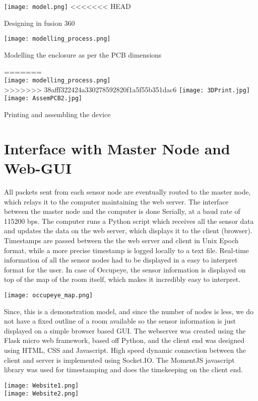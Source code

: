 \begin{center}
	\texttt{[image: model.png]}
<<<<<<< HEAD
	
	Designing in fusion 360	
	\vspace{15pt}
	
	\texttt{[image: modelling\_process.png]}
	
	Modelling the enclosure as per the PCB dimensions
	\vspace{15pt}
	
=======
	\\
	\vspace{10pt}
	\texttt{[image: modelling\_process.png]}
	\\
	\vspace{10pt}	
>>>>>>> 38afff322424a330278592820f1a5f55b351dac6
	\texttt{[image: 3DPrint.jpg]}
	\texttt{[image: AssemPCB2.jpg]}
	
	Printing and assembling the device
\end{center}

\section{Interface with Master Node and Web-GUI}
All packets sent from each sensor node are eventually routed to the master node, which relays it to the computer maintaining the web server. The interface between the master node and the computer is done Serially, at a baud rate of 115200 bps. The computer runs a Python script which receives all the sensor data and updates the data on the web server, which displays it to the client (browser). Timestamps are passed between the the web server and client in Unix Epoch format, while a more precise timestamp is logged locally to a text file. 
Real-time information of all the sensor nodes had to be displayed in a easy to interpret format for the user. In case of Occupeye, the sensor information is displayed on top of the map of the room itself, which makes it incredibly easy to interpret. 
\begin{center}
	\texttt{[image: occupeye\_map.png]}
\end{center}
Since, this is a demonstration model, and since the number of nodes is less, we do not have a fixed outline of a room available so the sensor information is just displayed on a simple browser based GUI.
The webserver was created using the Flask micro web framework, based off Python, and the client end was designed using HTML, CSS and Javascript. High speed dynamic connection between the client and server is implemented using Socket.IO. The MomentJS javascript library was used for timestamping and does the timekeeping on the client end.

\begin{center}
	\texttt{[image: Website1.png]}
	\\
	\texttt{[image: Website2.png]}
\end{center}

